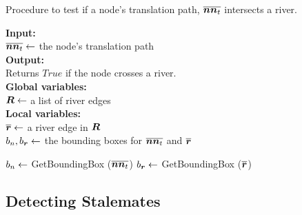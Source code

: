 \begin{algorithm}[tb!]
    \caption{Procedure to test if a node's translation path, $ \protect\overline{\bm{n}\bm{n}_t} $ intersects a river.}\label{alg:check river intersection}
    \textbf{Input:} \\
    $ \protect\overline{\bm{n}\bm{n}_t} \gets $ the node's translation path \\

    \textbf{Output:} \\
    Returns $ True $ if the node crosses a river. \\

    \textbf{Global variables:} \\
    $ \bm{R} \gets $ a list of river edges \\

    \textbf{Local variables:} \\
    $ \protect\overline{\bm{r}} \gets $ a river edge in $ \bm{R} $ \\ 
    $ b_n, b_{\bm{r}} \gets $ the bounding boxes for $ \protect\overline{\bm{n}\bm{n}_t} $ and $ \protect\overline{\bm{r}} $ \\

    \begin{algorithmic}[1]
        
        \ForEach{$ \riverEdgeLine \in \riverEdgeList $}
            \State $ b_n \gets $ GetBoundingBox ($ \protect\overline{\bm{n}\bm{n}_t} $)
            \State $ b_{\bm{r}} \gets $ GetBoundingBox ($ \protect\overline{\bm{r}} $)

                \State {}
                \EndIf
        \EndFor
        
        \State {}
        \EndProcedure
    \end{algorithmic}
\end{algorithm}

\subsection{Detecting Stalemates}

